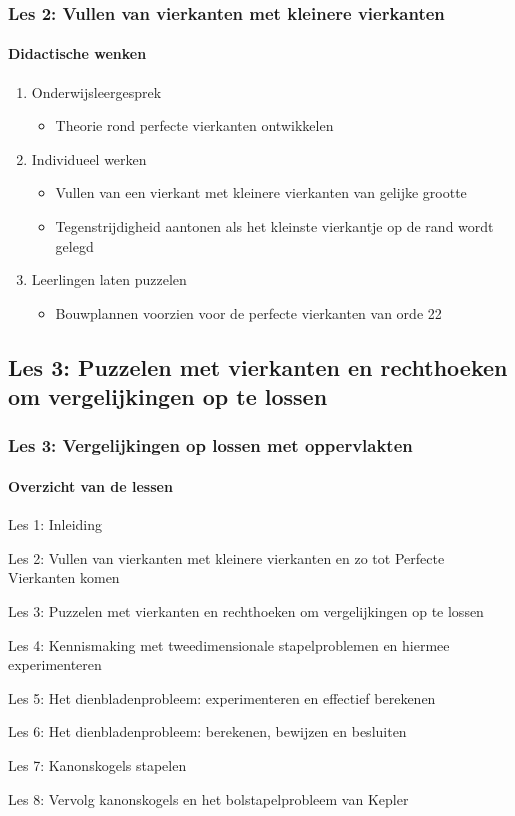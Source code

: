 \documentclass[dutch]{beamer}
\begin{document}
\begin{frame}
  \frametitle{Les 2: Vullen van vierkanten met kleinere vierkanten}
  \framesubtitle{Didactische wenken}
  \begin{enumerate}
    \item Onderwijsleergesprek
      \begin{itemize}
        \item Theorie rond perfecte vierkanten ontwikkelen
      \end{itemize}
    \item Individueel werken
      \begin{itemize}
        \item Vullen van een vierkant met kleinere vierkanten van gelijke grootte
        \item Tegenstrijdigheid aantonen als het kleinste vierkantje op de rand wordt gelegd
      \end{itemize}
    \item Leerlingen laten puzzelen
      \begin{itemize}
        \item Bouwplannen voorzien voor de perfecte vierkanten van orde 22
      \end{itemize}
  \end{enumerate}
\end{frame}



\subsection{Les 3: Puzzelen met vierkanten en rechthoeken om vergelijkingen op te lossen}
\begin{frame}
\frametitle{Les 3: Vergelijkingen op lossen met oppervlakten}
\framesubtitle{Overzicht van de lessen}
\begin{list}{\quad}{}
\item Les 1: Inleiding
\item Les 2: Vullen van vierkanten met kleinere vierkanten en zo tot Perfecte Vierkanten komen
\item {\color{blue}Les 3: Puzzelen met vierkanten en rechthoeken om vergelijkingen op te lossen}
\item Les 4: Kennismaking met tweedimensionale stapelproblemen en hiermee experimenteren
\item Les 5: Het dienbladenprobleem: experimenteren en effectief berekenen
\item Les 6: Het dienbladenprobleem: berekenen, bewijzen en besluiten
\item Les 7: Kanonskogels stapelen
\item Les 8: Vervolg kanonskogels en het bolstapelprobleem van Kepler
\end{list}
\end{frame}
\end{document}
